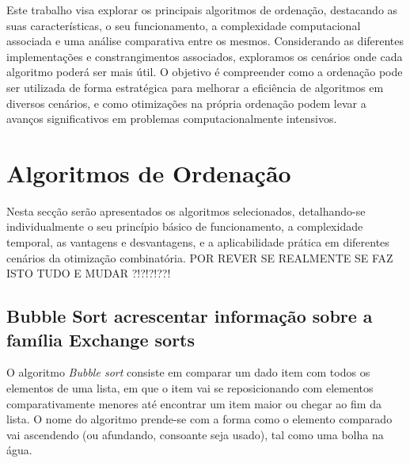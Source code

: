 \documentclass[conference]{IEEEtran}
\begin{document}
Este trabalho visa explorar os principais algoritmos de ordenação, destacando as suas características, o seu funcionamento, a complexidade computacional associada e uma análise comparativa entre os mesmos. Considerando as diferentes implementações e constrangimentos associados, exploramos os cenários onde cada algoritmo poderá ser mais útil. 
O objetivo é compreender como a ordenação pode ser utilizada de forma estratégica para melhorar a eficiência de algoritmos em diversos cenários, e como otimizações na própria ordenação podem levar a avanços significativos em problemas computacionalmente intensivos.


\section{Algoritmos de Ordenação}

Nesta secção serão apresentados os algoritmos selecionados, detalhando-se individualmente o seu princípio básico de funcionamento, a complexidade temporal, as vantagens e desvantagens, e a aplicabilidade prática em diferentes cenários da otimização combinatória. POR REVER SE REALMENTE SE FAZ ISTO TUDO E MUDAR ?!?!?!??!

\subsection{Bubble Sort acrescentar informação sobre a família Exchange sorts}

O algoritmo \textit{Bubble sort} consiste em comparar um dado item com todos os elementos de uma lista, em que o item vai se reposicionando com elementos comparativamente menores até encontrar um item maior ou chegar ao fim da lista. O nome do algoritmo prende-se com a forma como o elemento comparado vai ascendendo (ou afundando, consoante seja usado), tal como uma bolha na água. 
\end{document}
